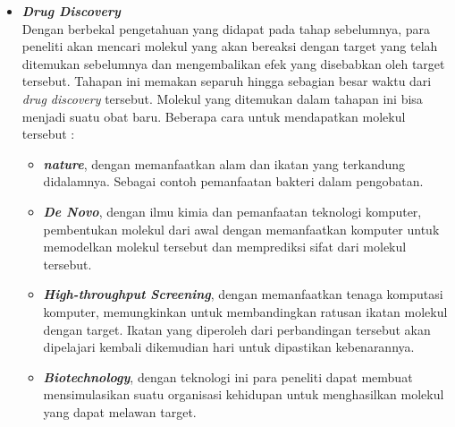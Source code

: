 \begin{itemize}
\item{\textbf{\textit{Drug Discovery}}}
\\Dengan berbekal pengetahuan yang didapat pada tahap sebelumnya, para peneliti akan mencari molekul yang akan bereaksi dengan target yang telah ditemukan sebelumnya dan mengembalikan efek yang disebabkan oleh target tersebut. Tahapan ini memakan separuh hingga sebagian besar waktu dari \textit{drug discovery} tersebut. Molekul yang ditemukan dalam tahapan ini bisa menjadi suatu obat baru. Beberapa cara untuk mendapatkan molekul tersebut :
\begin{itemize}
	\item \textbf{\textit{nature}}, dengan memanfaatkan alam dan ikatan yang terkandung didalamnya. Sebagai contoh pemanfaatan bakteri dalam pengobatan.
	\item \textbf{\textit{De Novo}}, dengan ilmu kimia dan pemanfaatan teknologi komputer, pembentukan molekul dari awal dengan memanfaatkan komputer untuk memodelkan molekul tersebut dan memprediksi sifat dari molekul tersebut.
	\item \textbf{\textit{High-throughput Screening}}, dengan memanfaatkan tenaga komputasi komputer, memungkinkan untuk membandingkan ratusan ikatan molekul dengan target. Ikatan yang diperoleh dari perbandingan tersebut akan dipelajari kembali dikemudian hari untuk dipastikan kebenarannya.
	\item \textbf{\textit{Biotechnology}}, dengan teknologi ini para peneliti dapat membuat mensimulasikan suatu organisasi kehidupan untuk menghasilkan molekul yang dapat melawan target.
\end{itemize}
\end{itemize}

